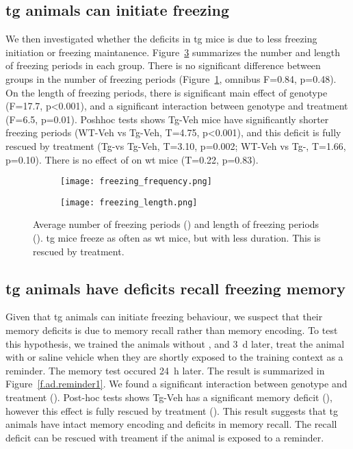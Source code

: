 \subsection{\Gls{tg} animals can initiate freezing}
We then investigated whether the deficits in \gls{tg} mice is due to less freezing initiation or freezing maintanence. Figure~\ref{f.ad.freezing_profile} summarizes the number and length of freezing periods in each group. There is no significant difference between groups in the number of freezing periods (Figure~\ref{f.ad.freezing_freq}, omnibus F=0.84, p=0.48). On the length of freezing periods, there is significant main effect of genotype (F=17.7, p<0.001), and a significant interaction between genotype and treatment (F=6.5, p=0.01). Poshhoc tests shows Tg-Veh mice have significantly shorter freezing periods (WT-Veh vs Tg-Veh, T=4.75, p<0.001), and this deficit is fully rescued by \tglu treatment (Tg-\glu vs Tg-Veh, T=3.10, p=0.002; WT-Veh vs Tg-\glu, T=1.66, p=0.10). There is no effect of \tglu on \gls{wt} mice (T=0.22, p=0.83). 

\begin{figure}[h]
    \begin{subfigure}[h]{\textwidth}
        \texttt{[image: freezing\_frequency.png]}
        \caption{\label{f.ad.freezing_freq}}
    \end{subfigure}
    \begin{subfigure}[h]{\textwidth}
        \texttt{[image: freezing\_length.png]}
        \caption{\label{f.ad.freezing_length}}
    \end{subfigure}
    \caption{Average number of freezing periods () and length of freezing periods (). \Gls{tg} mice freeze as often as \gls{wt} mice, but with less duration. This is rescued by \tglu treatment. \label{f.ad.freezing_profile}}
\end{figure}




\subsection{\Gls{tg} animals have deficits recall freezing memory}
Given that \gls{tg} animals can initiate freezing behaviour, we suspect that their memory deficits is due to memory recall rather than memory encoding. To test this hypothesis, we trained the animals without \tglu, and \SI{3}{\day} later, treat the animal with \tglu or saline vehicle when they are shortly exposed to the training context as a reminder. The memory test occured \SI{24}{\hour} later. The result is summarized in Figure~\ref{f.ad.reminder1}. We found a significant interaction between genotype and treatment (). Post-hoc tests shows Tg-Veh has a significant memory deficit (), however this effect is fully rescued by \tglu treatment (). This result suggests that \gls{tg} animals have intact memory encoding and deficits in memory recall. The recall deficit can be rescued with \tglu treament if the animal is exposed to a reminder.

